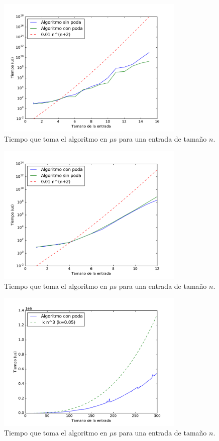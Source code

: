 \begin{figure}[H]
 \centering
	\includegraphics[width=0.8\textwidth]{img/tiempos/kamehameha2.pdf}
	\caption{\footnotesize Tiempo que toma el algoritmo en $\mu$s para una entrada de tamaño $n$.}
	\label{fig:kamehameha-tiempos2}
\end{figure}

\begin{figure}[H]
 \centering
	\includegraphics[width=0.8\textwidth]{img/tiempos/kamehameha1.pdf}
	\caption{\footnotesize Tiempo que toma el algoritmo en $\mu$s para una entrada de tamaño $n$.}
	\label{fig:kamehameha-tiempos1}
\end{figure}

\begin{figure}[H]
 \centering
	\includegraphics[width=0.8\textwidth]{img/tiempos/kamehameha3.pdf}
	\caption{\footnotesize Tiempo que toma el algoritmo en $\mu$s para una entrada de tamaño $n$.}
	\label{fig:kamehameha-tiempos3}
\end{figure}

